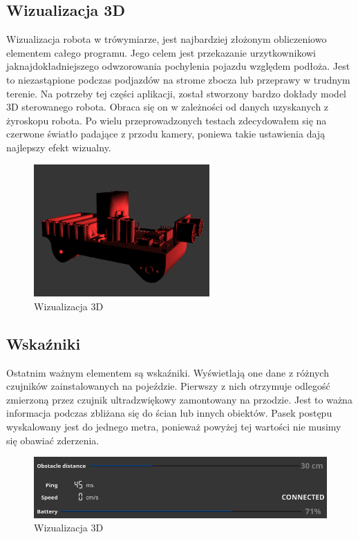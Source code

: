 \documentclass[12pt,a4paper,polish]{article}
\begin{document}
  \subsection{Wizualizacja 3D}
  Wizualizacja robota w trówymiarze, jest najbardziej złożonym obliczeniowo
  elementem całego programu. Jego celem jest przekazanie urzytkownikowi 
  jaknajdokładniejszego odwzorowania pochylenia pojazdu względem podłoża.
  Jest to niezastąpione podczas podjazdów na strome zbocza lub przeprawy 
  w trudnym terenie. Na potrzeby tej części aplikacji, został stworzony
  bardzo dokłady model 3D sterowanego robota. Obraca się on  w zależności 
  od danych uzyskanych z żyroskopu robota. Po wielu przeprowadzonych
  testach zdecydowałem się na czerwone światło padające z przodu kamery,
  poniewa takie ustawienia dają najlepszy efekt wizualny.

  \begin{figure}[h]
    \centering
    \includegraphics[width=0.6\textwidth]{img/final/3d.png}
    \caption{Wizualizacja 3D}
    \label{fig:3d}
  \end{figure}


  \subsection{Wskaźniki}
  Ostatnim ważnym elementem są wskaźniki. Wyświetlają one dane z różnych
  czujników zainstalowanych na pojeździe. Pierwszy z nich otrzymuje odlegość
  zmierzoną przez czujnik ultradzwiękowy zamontowany na przodzie. Jest to 
  ważna informacja podczas zbliżana się do ścian lub innych obiektów.
  Pasek postępu wyskalowany jest do jednego metra, ponieważ powyżej tej 
  wartości nie musimy się obawiać zderzenia.

  \begin{figure}[h]
    \centering
    \includegraphics[width=1\textwidth]{img/final/wska.png}
    \caption{Wizualizacja 3D}
    \label{fig:indications}
  \end{figure}
\end{document}
